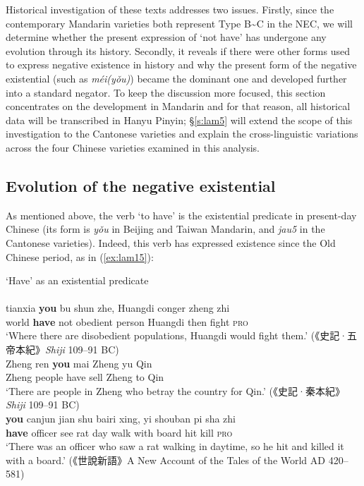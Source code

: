 \documentclass[output=paper,colorlinks,citecolor=brown,chinesefont]{langscibook}
\begin{document}
Historical investigation of these texts addresses two issues. Firstly, since the contemporary Mandarin varieties both represent Type B\sim C in the NEC, we will determine whether the present expression of `not have' has undergone any evolution through its history. Secondly, it reveals if there were other forms used to express negative existence in history and why the present form of the negative existential (such as \textit{méi(yǒu)}) became the dominant one and developed further into a standard negator. To keep the discussion more focused, this section concentrates on the development in Mandarin and for that reason, all historical data will be transcribed in Hanyu Pinyin; §\ref{s:lam5} will extend the scope of this investigation to the Cantonese varieties and explain the cross-linguistic variations across the four Chinese varieties examined in this analysis. 


\subsection{Evolution of the negative existential}\label{s:lam4-1}

As mentioned above, the verb `to have' is the existential predicate in present-day Chinese (its form is \textit{yǒu} in Beijing and Taiwan Mandarin, and \textit{jau5} in the Cantonese varieties). Indeed, this verb has expressed existence since the Old Chinese period, as in (\ref{ex:lam15}):

\ea `Have' as an existential predicate  \label{ex:lam15}\\
   \label{ex:lam15a}\\
  	\gll tianxia \textbf{you} bu shun zhe, Huangdi conger zheng zhi\\
  	world \textbf{have} not obedient person Huangdi then fight \textsc{pro}\\
  	\glt `Where there are disobedient populations, Huangdi would fight them.' ({\cn 《史記·五帝本紀》}\emph{Shiji} 109–91 BC)
   \label{ex:lam15b}\\
  	\gll Zheng ren \textbf{you}	mai	Zheng yu Qin\\
  	Zheng people have sell Zheng to Qin\\
  	\glt `There are people in Zheng who betray the country for Qin.' ({\cn 《史記·秦本紀》}\emph{Shiji} 109–91 BC)
   \label{ex:lam15c}\\
	\gll \textbf{you} canjun jian shu bairi xing, yi shouban pi sha zhi\\
	\textbf{have} officer see rat day walk with board hit kill \textsc{pro}\\
	\glt`There was an officer who saw a rat walking in daytime, so he hit and killed it with a board.' ({\cn 《世說新語》}A New Account of the Tales of the World AD 420–581)
\z \z 
\end{document}
